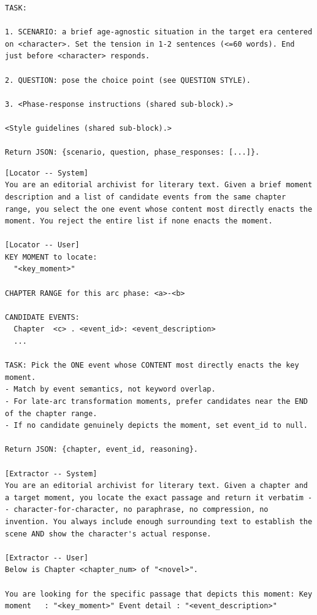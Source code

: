 \documentclass[11pt]{article}
\begin{document}
\begin{table}[htbp]
\begin{lstlisting}[basicstyle=\ttfamily\scriptsize]
TASK:

1. SCENARIO: a brief age-agnostic situation in the target era centered on <character>. Set the tension in 1-2 sentences (<=60 words). End just before <character> responds.

2. QUESTION: pose the choice point (see QUESTION STYLE).

3. <Phase-response instructions (shared sub-block).>

<Style guidelines (shared sub-block).>

Return JSON: {scenario, question, phase_responses: [...]}.
\end{lstlisting}
\end{table}

\begin{table}[htbp]
\centering
\caption{In-Scenario scene grounding (locator + extractor). Two calls, executed sequentially per (axis, anchor phase).}
\label{tab:prompt-locator-extractor}
\begin{lstlisting}[basicstyle=\ttfamily\scriptsize]
[Locator -- System]
You are an editorial archivist for literary text. Given a brief moment description and a list of candidate events from the same chapter range, you select the one event whose content most directly enacts the moment. You reject the entire list if none enacts the moment.

[Locator -- User]
KEY MOMENT to locate:
  "<key_moment>"

CHAPTER RANGE for this arc phase: <a>-<b>

CANDIDATE EVENTS:
  Chapter  <c> . <event_id>: <event_description>
  ...

TASK: Pick the ONE event whose CONTENT most directly enacts the key moment.
- Match by event semantics, not keyword overlap.
- For late-arc transformation moments, prefer candidates near the END of the chapter range.
- If no candidate genuinely depicts the moment, set event_id to null.

Return JSON: {chapter, event_id, reasoning}.

[Extractor -- System]
You are an editorial archivist for literary text. Given a chapter and a target moment, you locate the exact passage and return it verbatim -- character-for-character, no paraphrase, no compression, no invention. You always include enough surrounding text to establish the scene AND show the character's actual response.

[Extractor -- User]
Below is Chapter <chapter_num> of "<novel>".

You are looking for the specific passage that depicts this moment: Key moment   : "<key_moment>" Event detail : "<event_description>"


\end{lstlisting}
\end{table}
\end{document}
